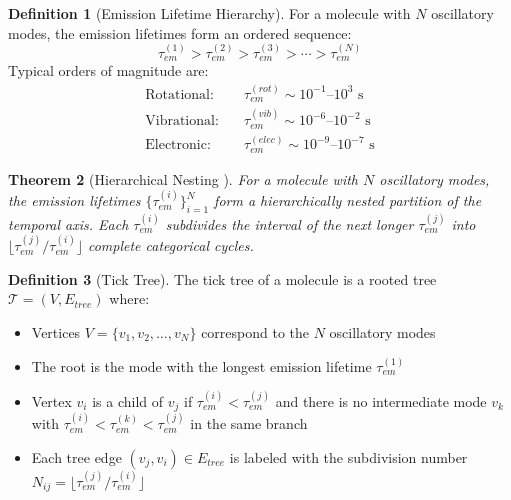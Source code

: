 \documentclass[11pt,a4paper]{article}
\newtheorem{theorem}{Theorem}[section]
\theoremstyle{definition}
\newtheorem{definition}[theorem]{Definition}
\theoremstyle{remark}
\begin{document}
\begin{definition}[Emission Lifetime Hierarchy]
\label{def:emission_hierarchy}
For a molecule with $N$ oscillatory modes, the emission lifetimes form an ordered sequence:
\begin{equation}
\tau_{em}^{(1)} > \tau_{em}^{(2)} > \tau_{em}^{(3)} > \cdots > \tau_{em}^{(N)}
\end{equation}
Typical orders of magnitude are:
\begin{align}
\text{Rotational:} \quad &\tau_{em}^{(rot)} \sim 10^{-1}\text{--}10^3 \text{ s} \\
\text{Vibrational:} \quad &\tau_{em}^{(vib)} \sim 10^{-6}\text{--}10^{-2} \text{ s} \\
\text{Electronic:} \quad &\tau_{em}^{(elec)} \sim 10^{-9}\text{--}10^{-7} \text{ s}
\end{align}
\end{definition}

\begin{theorem}[Hierarchical Nesting \cite{sachikonye2026harmonic}]
\label{thm:hierarchical_nesting}
For a molecule with $N$ oscillatory modes, the emission lifetimes $\{\tau_{em}^{(i)}\}_{i=1}^N$ form a hierarchically nested partition of the temporal axis. Each $\tau_{em}^{(i)}$ subdivides the interval of the next longer $\tau_{em}^{(j)}$ into $\lfloor \tau_{em}^{(j)}/\tau_{em}^{(i)} \rfloor$ complete categorical cycles.
\end{theorem}

\begin{definition}[Tick Tree]
\label{def:tick_tree}
The tick tree of a molecule is a rooted tree $\mathcal{T} = (V, E_{tree})$ where:
\begin{itemize}
\item Vertices $V = \{v_1, v_2, \ldots, v_N\}$ correspond to the $N$ oscillatory modes
\item The root is the mode with the longest emission lifetime $\tau_{em}^{(1)}$
\item Vertex $v_i$ is a child of $v_j$ if $\tau_{em}^{(i)} < \tau_{em}^{(j)}$ and there is no intermediate mode $v_k$ with $\tau_{em}^{(i)} < \tau_{em}^{(k)} < \tau_{em}^{(j)}$ in the same branch
\item Each tree edge $(v_j, v_i) \in E_{tree}$ is labeled with the subdivision number $N_{ij} = \lfloor \tau_{em}^{(j)}/\tau_{em}^{(i)} \rfloor$
\end{itemize}
\end{definition}
\end{document}
